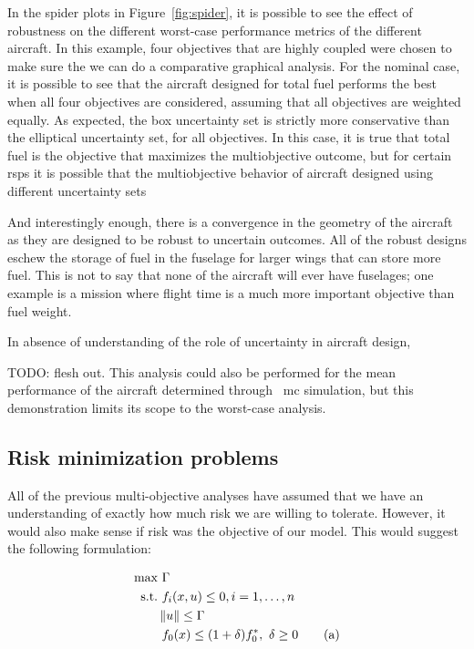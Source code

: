 In the spider plots in Figure~\ref{fig:spider}, it is possible to see the effect of robustness on
the different worst-case performance metrics of the different aircraft. In this example, four objectives that
are highly coupled were chosen to make sure the we can do a comparative graphical analysis.
For the nominal case, it is possible to see that
the aircraft designed for total fuel performs the best when all four objectives are considered,
assuming that all objectives are weighted equally. As expected,
the box uncertainty set is strictly more conservative than the elliptical uncertainty set, for
all objectives. In this case, it is true that total fuel is the objective that maximizes
the multiobjective outcome, but for certain \gls{rsp}s it is possible that the multiobjective behavior
of aircraft designed using different uncertainty sets

And interestingly enough, there is a convergence in the geometry of the aircraft as they are designed
to be robust to uncertain outcomes. All of the robust designs eschew the storage of fuel in the fuselage
for larger wings that can store more fuel. This is not to say that none of the aircraft will ever have
fuselages; one example is a mission where flight time is a much more important objective
than fuel weight.



In absence of understanding of the role of uncertainty in aircraft design,

TODO: flesh out.
This analysis could also be performed for the mean performance
of the aircraft determined through ~\gls{mc} simulation, but this demonstration limits
its scope to the worst-case analysis.

\subsection{Risk minimization problems}

All of the previous multi-objective analyses have assumed that we have an
understanding of exactly how much risk we are
willing to tolerate. However, it would also make sense if risk was the objective of our
model. This would suggest the following formulation:

\begin{align*}
    \text{max} &~\Gamma \\
    \text{s.t.}     &~f_i(x,u) \leq 0, i = 1,\ldots,n \\
                    & \left\lVert u\right\rVert \leq \Gamma \\
                    &~f_0(x) \leq (1+\delta)f_0^*,~\delta \geq 0 \tag{a}
    \label{eq:goalprogramming}
\end{align*}

